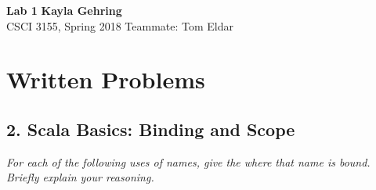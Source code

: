 \message{ !name(lab1-writeup.tex)}\documentclass[a4paper, 10pt]{article}
\begin{document}

\noindent
\large\textbf{Lab 1} \hfill \textbf{Kayla Gehring} \\
\normalsize CSCI 3155, Spring 2018 \hfill Teammate: Tom Eldar \\

\section*{Written Problems}

\subsection*{2. Scala Basics: Binding and Scope}
\textit{For each of the following uses of names, give the where that name is bound. Briefly explain your reasoning.}
\end{document}
